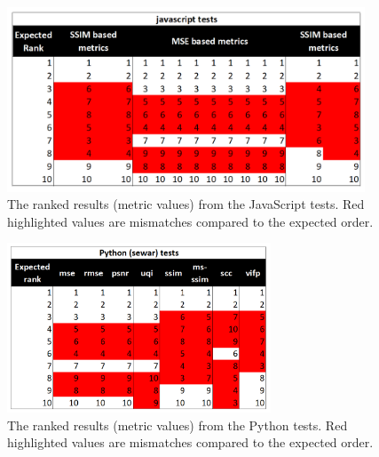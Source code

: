 \documentclass[12pt, titlepage]{article}
\begin{document}
\begin{figure}[h!]
  \begin{center}
  \includegraphics[width=0.95\textwidth]{test-analysis/js-ranked.png}
  \caption{The ranked results (metric values) from the JavaScript tests.
  Red highlighted values are mismatches compared to the expected order.}
  \label{fig_js_ranks}
  \end{center}
\end{figure}

\begin{figure}[h!]
  \begin{center}
  \includegraphics[width=0.7\textwidth]{test-analysis/py-ranked.png}
  \caption{The ranked results (metric values) from the Python tests.
  Red highlighted values are mismatches compared to the expected order.}
  \label{fig_py_ranks}
  \end{center}
\end{figure}
\end{document}
